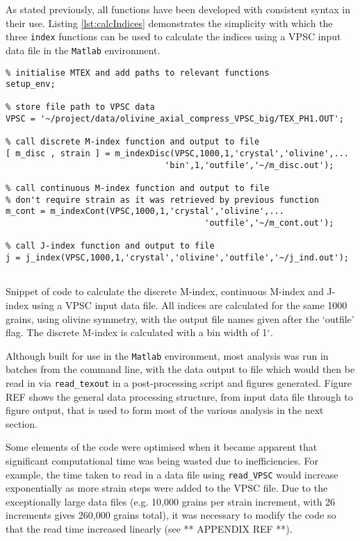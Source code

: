 \documentclass[a4paper,12pt]{report}
\numberwithin{equation}{chapter}
\begin{document}
As stated previously, all functions have been developed with consistent syntax in their use. Listing \ref{lst:calcIndices} demonstrates the simplicity with which the three \texttt{index} functions can be used to calculate the indices using a VPSC input data file in the \texttt{Matlab} environment.

\begin{program}[htbp] 
   \centering
   \begin{lstlisting}
% initialise MTEX and add paths to relevant functions
setup_env;   
   
% store file path to VPSC data
VPSC = '~/project/data/olivine_axial_compress_VPSC_big/TEX_PH1.OUT';

% call discrete M-index function and output to file
[ m_disc , strain ] = m_indexDisc(VPSC,1000,1,'crystal','olivine',...
                                'bin',1,'outfile','~/m_disc.out');

% call continuous M-index function and output to file
% don't require strain as it was retrieved by previous function
m_cont = m_indexCont(VPSC,1000,1,'crystal','olivine',...
                                        'outfile','~/m_cont.out');

% call J-index function and output to file
j = j_index(VPSC,1000,1,'crystal','olivine','outfile','~/j_ind.out');


 \end{lstlisting}
   \caption{Snippet of code to calculate the discrete M-index, continuous M-index and J-index using a VPSC input data file. All indices are calculated for the same 1000 grains, using olivine symmetry, with the output file names given after the \lq{}outfile\rq{} flag. The discrete M-index is calculated with a bin width of 1$^\circ$.}
   \label{lst:calcIndices}
\end{program}

Although built for use in the \texttt{Matlab} environment, most analysis was run in batches from the command line, with the data output to file which would then be read in via \texttt{read\_{}texout} in a post-processing script and figures generated. Figure REF shows the general data processing structure, from input data file through to figure output, that is used to form most of the various analysis in the next section.

Some elements of the code were optimised when it became apparent that significant computational time was being wasted due to inefficiencies. For example, the time taken to read in a data file using \texttt{read\_{}VPSC} would increase exponentially as more strain steps were added to the VPSC file. Due to the exceptionally large data files (e.g. 10,000 grains per strain increment, with 26 increments gives 260,000 grains total), it was necessary to modify the code so that the read time increased linearly (see ** APPENDIX REF **). 
\end{document}
